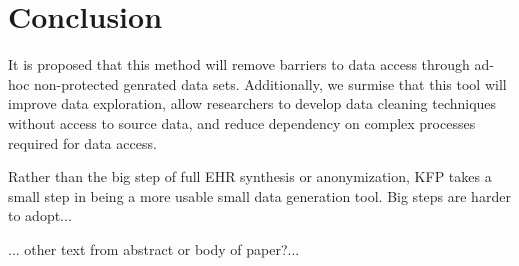 \documentclass{article}
\begin{document}
\section{Conclusion}

It is proposed that this method will remove barriers to data access through ad-hoc non-protected genrated data sets. Additionally, we surmise that this tool will improve data exploration, allow researchers to develop data cleaning techniques without access to source data, and reduce dependency on complex processes required for data access.

Rather than the big step of full EHR synthesis or anonymization, KFP takes a small step in being a more usable small data generation tool. Big steps are harder to adopt...

... other text from abstract or body of paper?...




\end{document}
